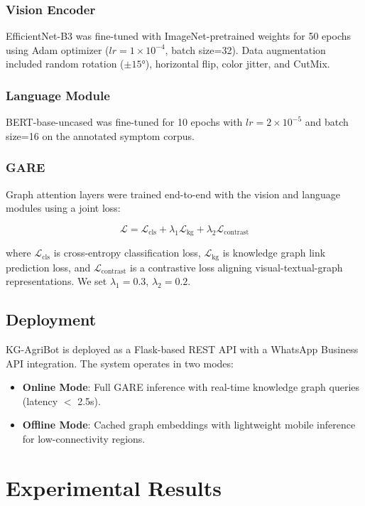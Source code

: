 \documentclass[conference]{IEEEtran}
\begin{document}
\subsubsection{Vision Encoder}
EfficientNet-B3 was fine-tuned with ImageNet-pretrained weights for 50 epochs using Adam optimizer ($lr=1\times10^{-4}$, batch size=32). Data augmentation included random rotation ($\pm15°$), horizontal flip, color jitter, and CutMix.

\subsubsection{Language Module}
BERT-base-uncased was fine-tuned for 10 epochs with $lr=2\times10^{-5}$ and batch size=16 on the annotated symptom corpus.

\subsubsection{GARE}
Graph attention layers were trained end-to-end with the vision and language modules using a joint loss:

\begin{equation}
\mathcal{L} = \mathcal{L}_{\text{cls}} + \lambda_1 \mathcal{L}_{\text{kg}} + \lambda_2 \mathcal{L}_{\text{contrast}}
\end{equation}

where $\mathcal{L}_{\text{cls}}$ is cross-entropy classification loss, $\mathcal{L}_{\text{kg}}$ is knowledge graph link prediction loss, and $\mathcal{L}_{\text{contrast}}$ is a contrastive loss aligning visual-textual-graph representations. We set $\lambda_1=0.3$, $\lambda_2=0.2$.

\subsection{Deployment}

KG-AgriBot is deployed as a Flask-based REST API with a WhatsApp Business API integration. The system operates in two modes:
\begin{itemize}
    \item \textbf{Online Mode}: Full GARE inference with real-time knowledge graph queries (latency $<$ 2.5s).
    \item \textbf{Offline Mode}: Cached graph embeddings with lightweight mobile inference for low-connectivity regions.
\end{itemize}

\section{Experimental Results}
\label{sec:results}
\end{document}
